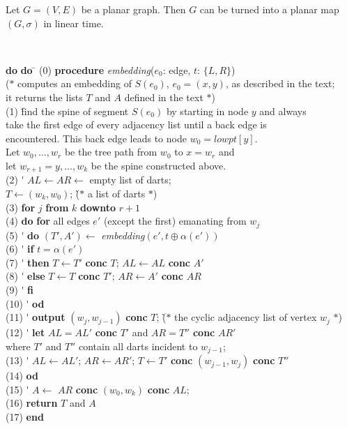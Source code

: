 \begin{theorem}
Let $G=(V,E)$ be a planar graph.
Then $G$ can be turned into a planar map $(G,\sigma)$ in linear time.
\end{theorem}
\begin{table}
~\hrulefill

\begin{tabbing}
\qquad \= {\bf do} \= {\bf do} \= \kill
\> (0) \' {\bf procedure} {\em embedding}($e_0$: edge, $t$: $\{L,R\}$)\+\\
($*$ computes an embedding of $S(e_0)$, $e_0=(x,y)$, as described in the text; %
\\
\> it returns the lists $T$ and $A$ defined in the text $*$)\-\\
\> (1) \' find the spine of segment $S(e_0)$ by starting in node $y$ and always%
\+\\
\> take the first edge of every adjacency list until a back edge is \\
\> encountered. This back edge leads to node $w_0=lowpt[y]$. \\
\> Let $w_0,\ldots,w_r$ be the tree path from $w_0$ to $x=w_r$ and \\
\> let $w_{r+1}=y,\ldots,w_k$ be the spine constructed above. \-\\
\> (2) \' $AL \gets AR \gets$ empty list of darts;\\
\>     \> $T \gets (w_k,w_0)$; \` ($*$ a list of darts $*$)\\
\> (3) \' {\bf for} $j$ {\bf from} $k$ {\bf downto} $r+1$ \\
\> (4) \' {\bf do} {\bf for} all edges $e'$ (except the first) emanating from
$w_j$ \\
\> (5) \' \> {\bf do} $(T',A') \gets$ {\em embedding}$(e',t\oplus\alpha(e'))$\\
\> (6) \' \> \> {\bf if} $t=\alpha(e')$\\
\> (7) \' \> \> {\bf then} $T \gets T'$ {\bf conc} $T$; $AL \gets AL$ {\bf
conc} $A'$\\
\> (8) \' \> \> {\bf else} $T \gets T$ {\bf conc} $T'$; $AR \gets A'$ {\bf
conc}  $AR$\\
\> (9) \' \> \> {\bf fi}\\
\>(10) \' \> {\bf od}\\
\>(11) \' \> {\bf output} $(w_j,w_{j-1})$ {\bf conc} $T$;
\` ($*$ the cyclic adjacency list of vertex $w_j$ $*$) \\
\>(12) \' \> {\bf let} $AL=AL'$ {\bf conc} $T'$ and $AR=T''$
{\bf conc} $AR'$\\
\>     \> \> where $T'$ and $T''$ contain all darts incident
to $w_{j-1}$;\\
\>(13) \' \> $AL\gets AL'$; $AR\gets AR'$; $T\gets
T'$ {\bf conc} $(w_{j-1},w_j)$ {\bf conc} $T''$\\
\>(14) \' {\bf od}\\
\>(15) \' $A\gets$ $AR$ {\bf conc} $(w_0,w_k)$ {\bf conc} $AL$;\\
\>(16) \' {\bf return} $T$ and $A$\\
\>(17) \' {\bf end}
\end{tabbing}


\end{table}
